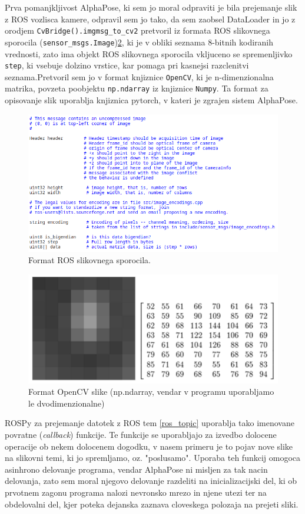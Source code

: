 \documentclass[a4paper,twoside,openright,12pt,slovene]{book}
\begin{document}
 Prva pomanjkljivost AlphaPose, ki sem jo moral odpraviti je bila prejemanje slik z ROS vozlisca kamere, odpravil sem jo tako, da sem zaobsel DataLoader in jo z orodjem \verb|CvBridge().imgmsg_to_cv2| pretvoril iz formata ROS slikovnega sporocila (\verb|sensor_msgs.Image|)\ref{ROS_img}, ki je v obliki seznama 8-bitnih kodiranih vrednosti, zato ima objekt ROS slikovnega sporocila vkljuceno se spremenljivko \verb|step|, ki vsebuje dolzino vrstice, kar pomaga pri kasnejsi razclenitvi seznama.Pretvoril sem jo v format knjiznice \verb|OpenCV|, ki je n-dimenzionalna matrika, povzeta poobjektu \verb|np.ndarray| iz knjiznice \verb|Numpy|. Ta format za opisovanje slik uporablja knjiznica pytorch, v kateri je zgrajen sistem AlphaPose.

\begin{figure}[h]
    \centering
    \includegraphics[width=0.75\columnwidth]{Slike/sensor_msg_image.png}
    \caption{\label{ROS_img} Format ROS slikovnega sporocila.}
\end{figure}

\begin{figure}[h]
    \centering
    \includegraphics[width=0.7\columnwidth]{Slike/matrix_Mat_object.png}
    \caption{\label{ROS_img} Format OpenCV slike (np.ndarray, vendar v programu uporabljamo le dvodimenzionalne)}
\end{figure}


 ROSPy za prejemanje datotek z ROS tem \ref{ros_topic} uporablja tako imenovane povratne (\textit{callback}) funkcije. Te funkcije se uporabljajo za izvedbo dolocene operacije ob nekem dolocenem dogodku, v nasem primeru je to pojav nove slike na slikovni temi, ki jo spremljamo, oz. "poslusamo". Uporaba teh funkcij omogoca asinhrono delovanje programa, vendar AlphaPose ni misljen za tak nacin delovanja, zato sem moral njegovo delovanje razdeliti na inicializacijski del, ki ob prvotnem zagonu programa nalozi nevronsko mrezo in njene utezi ter na obdelovalni del, kjer poteka dejanska zaznava cloveskega polozaja na prejeti sliki.
\end{document}
